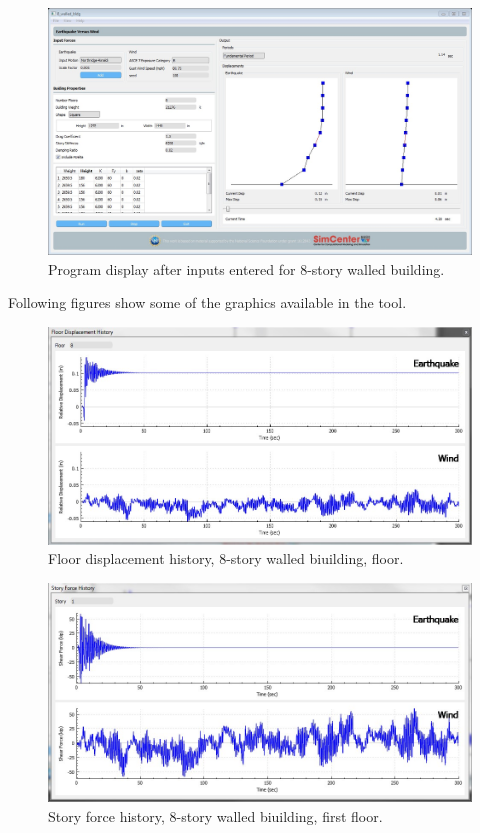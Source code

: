 \documentclass{simcenterdocumentation}
\begin{document}
\begin{figure}[H]
	\centering \includegraphics[width=0.9\linewidth]{8_walled_bldg_1.jpg}
	\caption{Program display after inputs entered for 8-story walled building.}
\end{figure}
Following figures show some of the graphics available in the tool.
\begin{figure}[H]
	\centering \includegraphics[scale=0.35]{8_walled_bldg_fdh.jpg}
	\caption{Floor displacement history, 8-story walled biuilding,  floor.}
\end{figure}
\begin{figure}[H]
	\centering \includegraphics[scale=0.35]{8_walled_bldg_sfh.jpg}
	\caption{Story force history, 8-story walled biuilding, first floor.}
\end{figure}
\end{document}

